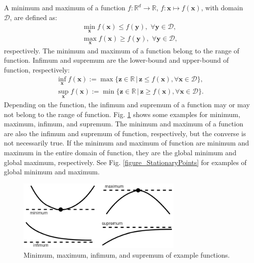 \documentclass[lang=cn,10pt]{gorgeousnbook}
\numberwithin{equation}{section}%
\numberwithin{figure}{section}%
\begin{document}
\begin{definition}
A minimum and maximum of a function $f: \mathbb{R}^d \rightarrow \mathbb{R}$, $f: \boldsymbol{x} \mapsto f(\boldsymbol{x})$, with domain $\mathcal{D}$, are defined as:
  \begin{align*}
  & \min_{\boldsymbol{x}} f(\boldsymbol{x}) \leq f(\boldsymbol{y}),\,\, \forall \boldsymbol{y} \in \mathcal{D}, \\
  & \max_{\boldsymbol{x}} f(\boldsymbol{x}) \geq f(\boldsymbol{y}),\,\, \forall \boldsymbol{y} \in \mathcal{D}, 
  \end{align*}
  respectively. The minimum and maximum of a function belong to the range of function. Infimum and supremum are the lower-bound and upper-bound of function, respectively:
  \begin{align*}
  & \inf_{\boldsymbol{x}} f(\boldsymbol{x}) := \max\{\boldsymbol{z} \in \mathbb{R}\, |\, \boldsymbol{z} \leq f(\boldsymbol{x}), \forall \boldsymbol{x} \in \mathcal{D}\}, \\
  & \sup_{\boldsymbol{x}} f(\boldsymbol{x}) := \min\{\boldsymbol{z} \in \mathbb{R}\, |\, \boldsymbol{z} \geq f(\boldsymbol{x}), \forall \boldsymbol{x} \in \mathcal{D}\}.
  \end{align*}
  Depending on the function, the infimum and supremum of a function may or may not belong to the range of function. Fig. \ref{figure_min_max_inf_sup} shows some examples for minimum, maximum, infimum, and supremum. The minimum and maximum of a function are also the infimum and supremum of function, respectively, but the converse is not necessarily true. 
  If the minimum and maximum of function are minimum and maximum in the entire domain of function, they are the global minimum and global maximum, respectively. 
  See Fig. \ref{figure_StationaryPoints} for examples of global minimum and maximum. 
\end{definition}

\begin{figure}[!t]
  \centering
  \includegraphics[width=3.2in]{./images/min_max_inf_sup}
  \caption{Minimum, maximum, infimum, and supremum of example functions.}
  \label{figure_min_max_inf_sup}
\end{figure}
\end{document}
